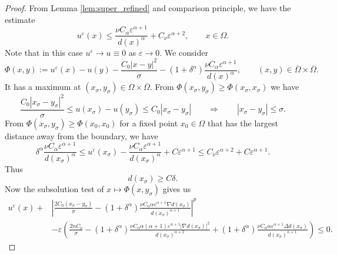 \documentclass[11pt,reqno]{amsart}
\numberwithin{figure}{section}
\theoremstyle{plain}
\theoremstyle{remark}
\numberwithin{equation}{section}
\begin{document}
\begin{proof} From Lemma \ref{lem:super_refined} and comparison principle, we have the estimate
\begin{equation*}
    u^\varepsilon(x)\leq \frac{\nu C_\alpha \varepsilon^{\alpha+1}}{d(x)^\alpha} + C_\nu\varepsilon^{\alpha+2}, \qquad x\in \Omega.
\end{equation*}
Note that in this case $u^\varepsilon \to u \equiv 0$ as $\varepsilon\to 0$. We consider
\begin{equation*}
    \Phi(x,y) := u^\varepsilon(x) - u(y) - \frac{C_0|x-y|^2}{\sigma} - (1+\delta^\alpha)\frac{\nu C_\alpha \varepsilon^{\alpha+1}}{d(x)^\alpha}, \qquad (x,y)\in \overline{\Omega}\times\overline{\Omega}.
\end{equation*}
It has a maximum at $(x_\sigma,y_\sigma)\in \Omega\times\overline{\Omega}$. From $\Phi(x_\sigma,y_\sigma)\geq \Phi(x_\sigma,x_\sigma)$ we have
\begin{equation*}
    \frac{C_0|x_\sigma-y_\sigma|^2}{\sigma}\leq u(x_\sigma) - u(y_\sigma)\leq C_0|x_\sigma - y_\sigma| \qquad\Longrightarrow\qquad |x_\sigma - y_\sigma|\leq \sigma.
\end{equation*}
From $\Phi(x_\sigma,y_\sigma)\geq \Phi(x_0,x_0)$ for a fixed point $x_0 \in \Omega$ that has the largest distance away from the boundary, we have
\begin{equation*}
    \delta^\alpha\frac{\nu C_\alpha \varepsilon^{\alpha+1}}{d(x_{\sigma})^\alpha} \leq u^\varepsilon(x_{\sigma}) - \frac{\nu C_\alpha \varepsilon^{\alpha+1}}{d(x_{\sigma})^\alpha} + C\varepsilon^{\alpha+1} \leq C_{\nu}\varepsilon^{\alpha+2}+ C\varepsilon^{\alpha+1}.
\end{equation*}
Thus
\begin{equation*}
    d(x_\sigma) \geq C\delta.
\end{equation*}
Now the subsolution test of $x\mapsto \Phi(x,y_\sigma)$ gives us
\begin{equation*}
\begin{split}
    u^\varepsilon(x) + &\left|\frac{2C_0(x_\sigma-y_\sigma)}{\sigma}-(1+\delta^\alpha)\frac{\nu C_\alpha\alpha\varepsilon^{\alpha+1}\nabla d(x_\sigma)}{d(x_\sigma)^{\alpha+1}}\right|^p \\
    &- \varepsilon \left(\frac{2nC_0}{\sigma} - (1+\delta^\alpha)\frac{\nu C_\alpha\alpha(\alpha + 1)\varepsilon^{\alpha+1}|\nabla d(x_\sigma)|^2}{d(x_\sigma)^{\alpha+2}} + (1+\delta^\alpha)\frac{\nu C_\alpha \alpha \varepsilon^{\alpha+1}\Delta d(x_\sigma)}{d(x_\sigma)^{\alpha+1}}\right)\leq 0.
\end{split}    

\end{equation*}
\end{proof}
\end{document}
